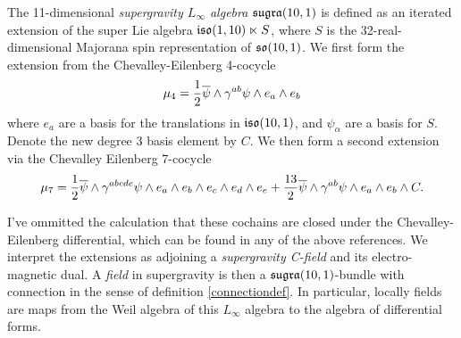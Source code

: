 \documentclass[10pt, oneside]{article}
\begin{document}
\begin{definition}
The 11-dimensional \emph{supergravity $L_\infty$ algebra} $\mathfrak{sugra}(10,1)$ is defined as an iterated extension of the super Lie algebra $\mathfrak{iso}(1,10) \ltimes S$, where $S$ is the 32-real-dimensional Majorana spin representation of $\mathfrak{so}(10,1)$.  We first form the extension from the Chevalley-Eilenberg 4-cocycle
\[\mu_4 = \frac 12 \overline{\psi} \wedge \gamma^{ab} \psi \wedge e_a \wedge e_b \]
where $e_a$ are a basis for the translations in $\mathfrak{iso}(10,1)$, and $\psi_\alpha$ are a basis for $S$.  Denote the new degree 3 basis element by $C$.  We then form a second extension via the Chevalley Eilenberg 7-cocycle
\[\mu_7 = \frac 12 \overline{\psi} \wedge \gamma^{abcde} \psi \wedge e_a \wedge e_b \wedge e_c \wedge e_d \wedge e_e + \frac {13}2 \overline{\psi} \wedge \gamma^{ab} \psi \wedge e_a \wedge e_b \wedge C.\]
\end{definition}
I've ommitted the calculation that these cochains are closed under the Chevalley-Eilenberg differential, which can be found in any of the above references.  We interpret the extensions as adjoining a \emph{supergravity C-field} and its electro-magnetic dual.  A \emph{field} in supergravity is then a $\mathfrak{sugra}(10,1)$-bundle with connection in the sense of definition \ref{connectiondef}.  In particular, locally fields are maps from the Weil algebra of this $L_\infty$ algebra to the algebra of differential forms.
\end{document}
